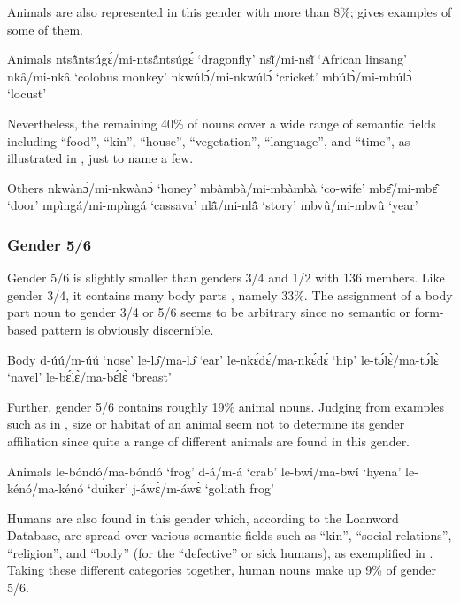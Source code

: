 \noindent Animals are also represented in this gender with more than 8\%;  gives examples of some of them.

\ea\label{3/4animal} Animals
\ea ntsã̂ntsúgɛ́/mi-ntsã̂ntsúgɛ́ `dragonfly'
\ex nsĩ̂/mi-nsĩ̂ `African linsang'
\ex nkâ/mi-nkâ `colobus monkey'
\ex nkwúlɔ́/mi-nkwúlɔ́ `cricket'
\ex mbúlɔ̀/mi-mbúlɔ̀ `locust'
\z
\z

\noindent Nevertheless, the remaining 40\% of nouns cover a wide range of semantic fields including ``food'', ``kin'', ``house'', ``vegetation'', ``language'', and ``time'', as illustrated in , just to name a few.

\ea\label{3/4other}  Others
\ea nkwànɔ̀/mi-nkwànɔ̀ `honey'
\ex mbàmbà/mi-mbàmbà `co-wife'
\ex mbɛ̂/mi-mbɛ̂ `door'
\ex mpìngá/mi-mpìngá `cassava'
\ex nlã̂/mi-nlã̂ `story'
\ex mbvû/mi-mbvû `year'
\z
\z


\subsubsection{Gender 5/6}
\label{sec:5/6}

Gender 5/6 is slightly smaller than genders 3/4 and 1/2 with 136 members. Like gender 3/4, it contains many body parts , namely 33\%. The assignment of a body part noun to gender 3/4 or 5/6 seems to be arbitrary since no semantic or form-based pattern is obviously discernible.

\ea\label{5/6body} Body
\ea d-úú/m-úú `nose'
\ex le-lɔ̂/ma-lɔ̂ `ear'
\ex le-nkɛ́dɛ́/ma-nkɛ́dɛ́ `hip'
\ex le-tɔ́lɛ̀/ma-tɔ́lɛ̀ `navel'
\ex le-bɛ́lɛ̀/ma-bɛ́lɛ̀ `breast'
\z
\z

\noindent Further, gender 5/6 contains roughly 19\% animal nouns. Judging from  examples such as in , size or habitat of an animal seem not to determine its gender affiliation since quite a range of different animals are found in this gender.

\ea\label{5/6animals} Animals
\ea le-bóndó/ma-bóndó `frog'
\ex d-á/m-á `crab'
\ex le-bwǐ/ma-bwǐ `hyena'
\ex le-kénó/ma-kénó `duiker'
\ex j-áwɛ̀/m-áwɛ̀ `goliath frog'
\z
\z

\noindent Humans are also found in this gender which, according to the Loanword Database, are spread over various semantic fields such as ``kin'', ``social relations'', ``religion'', and ``body'' (for the ``defective'' or sick humans), as exemplified in . Taking these different categories together, human nouns make up 9\% of gender 5/6.

